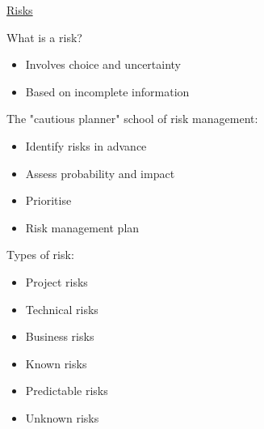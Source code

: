 \documentclass{article}[18pt]
\begin{document}
\begin{center}
\underline{\huge Risks}
\end{center}
What is a risk?
\begin{itemize}
	\item Involves choice and uncertainty
	\item Based on incomplete information
\end{itemize}
The "cautious planner" school of risk management:
\begin{itemize}
	\item Identify risks in advance
	\item Assess probability and impact
	\item Prioritise
	\item Risk management plan
\end{itemize}
Types of risk:
\begin{itemize}
	\item Project risks
	\item Technical risks
	\item Business risks
	\item Known risks
	\item Predictable risks
	\item Unknown risks
\end{itemize}
\end{document}
